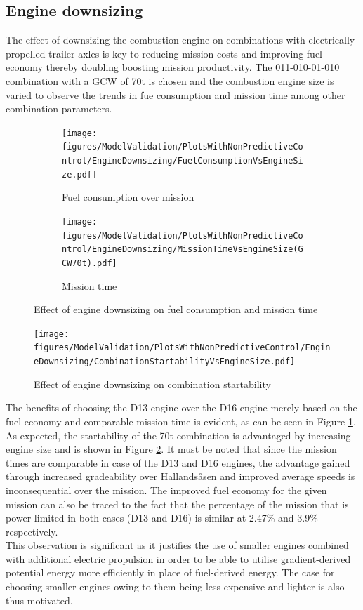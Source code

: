 \documentclass[ExampleMasters.tex]{subfiles}
\begin{document}
	\subsection{Engine downsizing}
	The effect of downsizing the combustion engine on combinations with electrically propelled trailer axles is key to reducing mission costs and improving fuel economy thereby doubling boosting mission productivity. The 011-010-01-010 combination with a GCW of 70t is chosen and the combustion engine size is varied to observe the trends in fue consumption and mission time among other combination parameters.
	\begin{figure}
	\begin{subfigure}{.5\textwidth}
	\centering
	\texttt{[image: figures/ModelValidation/PlotsWithNonPredictiveControl/EngineDownsizing/FuelConsumptionVsEngineSize.pdf]}
	\caption{Fuel consumption over mission}
	\end{subfigure}
	\begin{subfigure}{.5\textwidth}
	\centering
	\texttt{[image: figures/ModelValidation/PlotsWithNonPredictiveControl/EngineDownsizing/MissionTimeVsEngineSize(GCW70t).pdf]}
	\caption{Mission time}
	\end{subfigure}
	\caption{Effect of engine downsizing on fuel consumption and mission time}
	\label{fuelTimeEngineDownsize}
	\end{figure}
	\begin{figure}
	\centering
	\texttt{[image: figures/ModelValidation/PlotsWithNonPredictiveControl/EngineDownsizing/CombinationStartabilityVsEngineSize.pdf]}
	\caption{Effect of engine downsizing on combination startability}
	\label{startabilityEngineDownsize}
	\end{figure}
	The benefits of choosing the D13 engine over the D16 engine merely based on the fuel economy and comparable mission time is evident, as can be seen in Figure \ref{fuelTimeEngineDownsize}. As expected, the startability of the 70t combination is advantaged by increasing engine size and is shown in Figure \ref{startabilityEngineDownsize}. It must be noted that since the mission times are comparable in case of the D13 and D16 engines, the advantage gained through increased gradeability over Hallands\aa sen and improved average speeds is inconsequential over the mission. The improved fuel economy for the given mission can also be traced to the fact that the percentage of the mission that is power limited in both cases (D13 and D16) is similar at 2.47\% and 3.9\% respectively.\\
	This observation is significant as it justifies the use of smaller engines combined with additional electric propulsion in order to be able to utilise gradient-derived potential energy more efficiently in place of fuel-derived energy. The case for choosing smaller engines owing to them being less expensive and lighter is also thus motivated.\\
\end{document}
